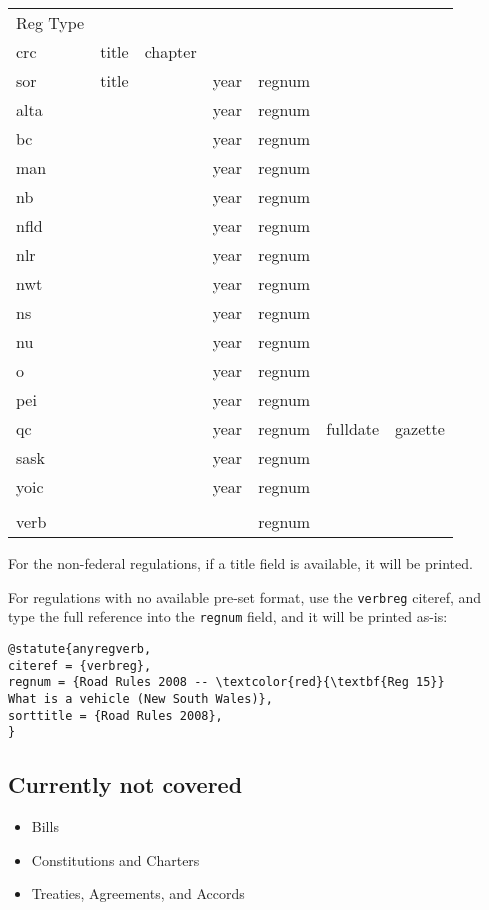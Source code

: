 \begin{tabular}{lllllll}
Reg Type &  & &&&& \\
crc & title & chapter &&&& \\
sor & title && year & regnum && \\
alta & && year & regnum && \\
bc &  && year & regnum && \\
man & && year & regnum && \\
nb &  && year & regnum && \\
nfld &  && year & regnum && \\
nlr &  && year & regnum && \\
nwt &  && year & regnum && \\
ns &  && year & regnum && \\
nu &  && year & regnum && \\
o &  && year & regnum && \\
pei &  && year & regnum && \\
qc &  && year & regnum & fulldate & gazette\\
sask &  && year & regnum && \\
yoic &  && year & regnum && \\
\\
verb &  &&  & regnum && \\
\end{tabular}
\bigskip

For the non-federal regulations, if a title field is available, it will be printed.
\bigskip

For regulations with no available pre-set format, use the \texttt{verbreg} citeref, and type the full reference into the \texttt{regnum} field, and it will be printed as-is:


\begin{verbatim}
@statute{anyregverb,
citeref = {verbreg},
regnum = {Road Rules 2008 -- \textcolor{red}{\textbf{Reg 15}} 
What is a vehicle (New South Wales)},
sorttitle = {Road Rules 2008},
}

\end{verbatim}


\subsection{Currently not covered}
\begin{itemize}
\item Bills
\item Constitutions and Charters
\item Treaties, Agreements, and Accords
\end{itemize}



